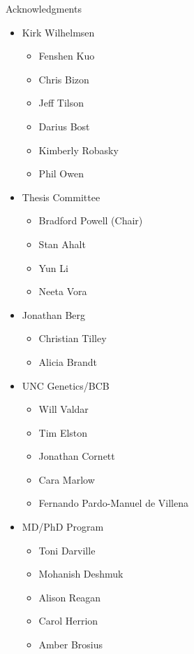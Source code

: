 \documentclass[
  10pt,
  ignorenonframetext,
  m]{beamer}
\begin{document}
\begin{frame}{Acknowledgments}

\begin{minipage}[t]{0.49\linewidth}
\begin{itemize}\scriptsize
  \item Kirk Wilhelmsen
  \begin{itemize}\scriptsize
    \item Fenshen Kuo
    \item Chris Bizon
    \item Jeff Tilson
    \item Darius Bost
    \item Kimberly Robasky
    \item Phil Owen
  \end{itemize}
  \item Thesis Committee
  \begin{itemize}\scriptsize
    \item Bradford Powell (Chair)
    \item Stan Ahalt
    \item Yun Li
    \item Neeta Vora
  \end{itemize}
  \item Jonathan Berg
  \begin{itemize}\scriptsize
    \item Christian Tilley
    \item Alicia Brandt
  \end{itemize}
\end{itemize}
\end{minipage}
\begin{minipage}[t]{0.49\linewidth}
\begin{itemize}\scriptsize
  \item UNC Genetics/BCB
  \begin{itemize}\scriptsize
    \item Will Valdar
    \item Tim Elston
    \item Jonathan Cornett
    \item Cara Marlow
    \item Fernando Pardo-Manuel de Villena
  \end{itemize}
  \item MD/PhD Program
  \begin{itemize}\scriptsize
    \item Toni Darville
    \item Mohanish Deshmuk
    \item Alison Reagan
    \item Carol Herrion
    \item Amber Brosius
  \end{itemize}
\end{itemize}
\end{minipage}


\end{frame}
\end{document}
